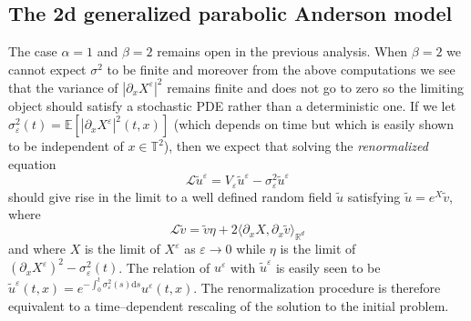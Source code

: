\documentclass[a4paper,11pt]{article}
\newcommand{\mathd}{\mathrm{d}}
\newcommand{\tmem}[1]{{\em #1\/}}
\newcommand{\LL}{\mathscr{L}}
\begin{document}
\subsection{The 2d generalized parabolic Anderson model}

The case $\alpha = 1$ and $\beta = 2$ remains open in the previous analysis.  When
$\beta = 2$ we cannot expect $\sigma^2$ to be finite and moreover from the above
computations we see that the variance of $| \partial_x X^{\varepsilon} |^2$
remains finite and does not go to zero so the limiting object should satisfy a
stochastic PDE rather than a deterministic one. If we let
$\sigma^2_{\varepsilon} (t) =\mathbb{E} [| \partial_x X^{\varepsilon} |^2 (t,
x)]$ (which depends on time but which is easily shown to be independent of $x
\in \mathbb{T}^2$), then we expect that solving the {\tmem{renormalized}}
equation
\[ \LL \tilde{u}^{\varepsilon} = V_{\varepsilon} \tilde{u}^{\varepsilon} -
   \sigma^2_{\varepsilon} \tilde{u}^{\varepsilon} \]
should give rise in the limit to a well defined random field $\tilde{u}$
satisfying $\tilde{u} = e^X \tilde{v}$, where
\[ \LL \tilde{v} = \tilde{v} \eta + 2 \langle \partial_x X, \partial_x
   \tilde{v} \rangle_{\mathbb{R}^d} \]
and where $X$ is the limit of $X^{\varepsilon}$ as $\varepsilon \rightarrow 0$
while $\eta$ is the limit of $(\partial_x X^{\varepsilon})^2 -
\sigma^2_{\varepsilon} (t)$. The relation of $u^{\varepsilon}$ with
$\tilde{u}^{\varepsilon}$ is easily seen to be $\tilde{u}^{\varepsilon} (t, x)
= e^{- \int_0^t \sigma^2_{\varepsilon} (s) \mathd s} u^{\varepsilon} (t, x)$.
The renormalization procedure is therefore equivalent to a time--dependent
rescaling of the solution to the initial problem.
\end{document}
